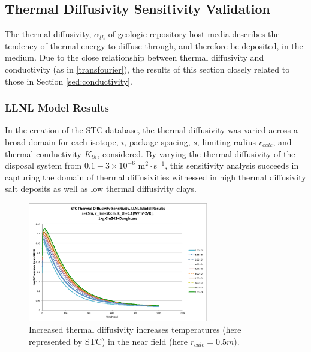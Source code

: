\subsection{Thermal Diffusivity Sensitivity Validation}\label{sec:diffusivity}
The thermal diffusivity, $\alpha_{th}$ of geologic repository host media 
describes the tendency of thermal energy to diffuse through, and therefore be 
deposited, in the medium. Due to the close relationship between thermal 
diffusivity and conductivity (as in \eqref{transfourier}), the results of this section 
closely related to those in Section \ref{sed:conductivity}.

\FloatBarrier
\subsubsection{LLNL Model Results}

In the creation of the \gls{STC} database, the thermal diffusivity was varied 
across a broad domain for each isotope, $i$, package spacing, $s$, limiting 
radius $r_{calc}$, and thermal conductivity $K_{th}$, considered.  By 
varying the thermal diffusivity of the disposal system from $0.1-3\times 
10^{-6}$ m$^2\cdot$s$^{-1}$, this sensitivity analysis succeeds in capturing the domain of 
thermal diffusivities witnessed in high thermal diffusivity salt deposits as 
well as low thermal diffusivity clays.

\begin{figure}[htbp!]
\begin{center}
\includegraphics[width=0.7\textwidth]{./chapters/demonstration/diffusivity/Cm242alpha_kth_low.eps}
\end{center}
\caption[$K_{th}$ Sensitivity to $\alpha_{th}$ for low $k_{th}$]{Increased thermal 
diffusivity increases temperatures (here represented by \gls{STC}) in the near field (here $r_{calc} = 0.5 m$).}
\label{fig:Cm242alpha_kth_low}
\end{figure}


